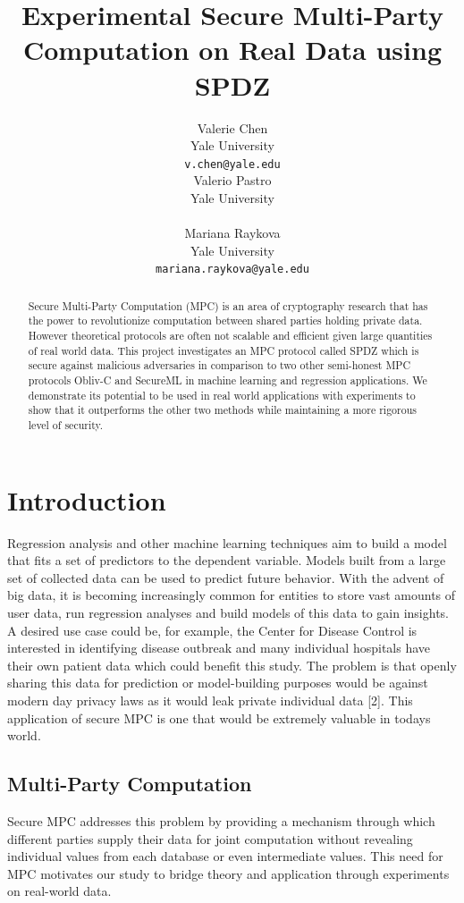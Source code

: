 \documentclass{article}
\title{Experimental Secure Multi-Party Computation on Real Data using SPDZ}
\author{
  Valerie Chen\\
  Yale University\\
  \texttt{v.chen@yale.edu} \\
  \And
  Valerio Pastro\\
  Yale University\\
  \textt{valerio.pastro@yale.edu}\\
  \And
  Mariana Raykova \\
  Yale University \\
  \texttt{mariana.raykova@yale.edu} \\
}
\begin{document}
\maketitle

\begin{abstract}
  Secure Multi-Party Computation (MPC) is an area of cryptography research that has the power to revolutionize computation between shared parties holding private data. However theoretical protocols are often not scalable and efficient given large quantities of real world data. This project investigates an MPC protocol called SPDZ which is secure against malicious adversaries in comparison to two other semi-honest MPC protocols Obliv-C and SecureML in machine learning and regression applications. We demonstrate its potential to be used in real world applications with experiments to show that it outperforms the other two methods while maintaining a more rigorous level of security.
\end{abstract}

\section{Introduction}

Regression analysis and other machine learning techniques aim to build a model that fits a set of predictors to the dependent variable. Models built from a large set of collected data can be used to predict future behavior. With the advent of big data, it is becoming increasingly common for entities to store vast amounts of user data, run regression analyses and build models of this data to gain insights. A desired use case could be, for example, the Center for Disease Control is interested in identifying disease outbreak and many individual hospitals have their own patient data which could benefit this study. The problem is that openly sharing this data for prediction or model-building purposes would be against modern day privacy laws as it would leak private individual data [2]. This application of secure MPC is one that would be extremely valuable in today\textquotesingle s world.

\subsection{Multi-Party Computation}

Secure MPC addresses this problem by providing a mechanism through which different parties supply their data for joint computation without revealing individual values from each database or even intermediate values. This need for MPC motivates our study to bridge theory and application through experiments on real-world data. 
\end{document}
